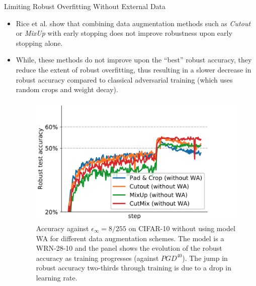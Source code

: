\begin{frame}{Limiting Robust Overfitting Without External Data}
    \begin{itemize}
        \item Rice et al. show that combining data augmentation methods such as \textit{Cutout} or \textit{MixUp} with early stopping does not improve robustness upon early stopping alone. 
        \item While, these methods do not improve upon the “best” robust accuracy, they reduce the extent of robust overfitting, thus resulting in a slower decrease in robust accuracy compared to classical adversarial training (which uses random crops and weight decay). 
        \begin{figure}
            \begin{minipage}[c]{0.6\linewidth}
                \includegraphics[height=.4\textheight]{pic/data_aug.png}
            \end{minipage}
            \begin{minipage}[c]{0.35\linewidth}
                \caption{Accuracy against $\epsilon_\infty = 8/255$ on CIFAR-10 without using model WA for different data augmentation schemes. The model is a WRN-28-10 and the panel shows the evolution of the robust accuracy as training progresses (against $PGD^{40}$). The jump in robust accuracy two-thirds through training is due to a drop in learning rate.}\label{fig:data_aug}
            \end{minipage}
        \end{figure}
    \end{itemize}
\end{frame}

